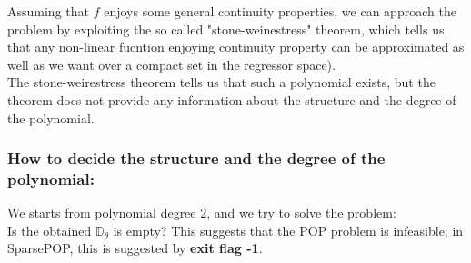 \begin{QandAbox}[Result:]
Assuming that $f$ enjoys some general continuity properties, we can approach the problem by exploiting the so called "stone-weinestress" theorem, which tells us that any non-linear fucntion enjoying continuity property can be approximated as well as we want over a compact set in the regressor space).\\

The stone-weirestress theorem tells us that such a polynomial exists, but the theorem does not provide any information about the structure and the degree of the polynomial.
\end{QandAbox}

 \subsubsection{How to decide the structure and the degree of the polynomial:}
 We starts from polynomial degree 2, and we try to solve the problem:\\
 Is the obtained $\mathbb{D}_\theta$ is empty? This suggests that the POP problem is infeasible; in SparsePOP, this is suggested by \textbf{exit flag -1}.
